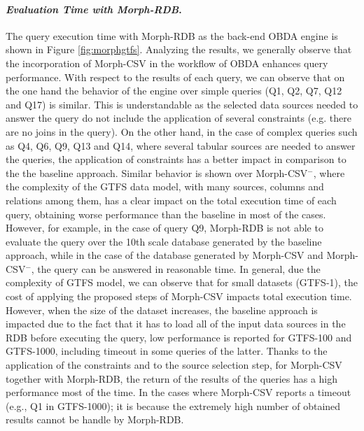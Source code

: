 \noindent\paragraph*{\textit{Evaluation Time with Morph-RDB}.}
The query execution time with Morph-RDB as the back-end OBDA engine is shown in Figure \ref{fig:morphgtfs}. Analyzing the results, we generally observe that the incorporation of Morph-CSV in the workflow of OBDA enhances query performance. With respect to the results of each query, we can observe that on the one hand the behavior of the engine over simple queries (Q1, Q2, Q7, Q12 and Q17) is similar. This is understandable as the selected data sources needed to answer the query do not include the application of several constraints (e.g. there are no joins in the query). On the other hand, in the case of complex queries such as Q4, Q6, Q9, Q13 and Q14, where several tabular sources are needed to answer the queries, the application of constraints has a better impact in comparison to the the baseline approach. Similar behavior is shown over Morph-CSV$^-$, where the complexity of the GTFS data model, with many sources, columns and relations among them, has a clear impact on the total execution time of each query, obtaining worse performance than the baseline in most of the cases. However, for example, in the case of query Q9, Morph-RDB is not able to evaluate the query over the 10th scale database generated by the baseline approach, while in the case of the database generated by Morph-CSV and Morph-CSV$^-$, the query can be answered in reasonable time. In general, due the complexity of GTFS model, we can observe that for small datasets (GTFS-1), the cost of applying the proposed steps of Morph-CSV impacts total execution time. However, when the size of the dataset increases, the baseline approach is impacted due to the fact that it has to load all of the input data sources in the RDB before executing the query, low performance is reported for GTFS-100 and GTFS-1000, including timeout in some queries of the latter. Thanks to the application of the constraints and to the source selection step, for Morph-CSV together with Morph-RDB, the return of the results of the queries has a high performance most of the time. In the cases where Morph-CSV reports a timeout (e.g., Q1 in GTFS-1000); it is because the extremely high number of obtained results cannot be handle by Morph-RDB.

